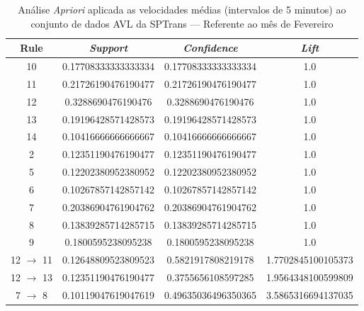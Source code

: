 \documentclass[
	12pt,				%
	oneside,			%
	a4paper,			%
	english,			%
	brazil				%
	]{abntex2ppgsi}
\begin{document}
\begin{apendicesenv}
\begin{table}[!htb]
\centering
\caption {Análise \textit{Apriori} aplicada as velocidades médias (intervalos de 5 minutos) ao conjunto de dados AVL da SPTrans --- Referente ao mês de Fevereiro}
\label {tab:aprioriFebruary}
\begin{tabular}{c|c|c|c}
\hline
\textbf{Rule} & \textit{\textbf{Support}} & \textit{\textbf{Confidence}} & \textit{\textbf{Lift}} \\
\hline
10 &  0.17708333333333334 &  0.17708333333333334 &  1.0\\ \hline 11 &  0.21726190476190477 &  0.21726190476190477 &  1.0\\ \hline 12 &  0.3288690476190476 &  0.3288690476190476 &  1.0\\ \hline 13 &  0.19196428571428573 &  0.19196428571428573 &  1.0\\ \hline 14 &  0.10416666666666667 &  0.10416666666666667 &  1.0\\ \hline 2 &  0.12351190476190477 &  0.12351190476190477 &  1.0\\ \hline 5 &  0.12202380952380952 &  0.12202380952380952 &  1.0\\ \hline 6 &  0.10267857142857142 &  0.10267857142857142 &  1.0\\ \hline 7 &  0.20386904761904762 &  0.20386904761904762 &  1.0\\ \hline 8 &  0.13839285714285715 &  0.13839285714285715 &  1.0\\ \hline 9 &  0.1800595238095238 &  0.1800595238095238 &  1.0\\ \hline 12 $\rightarrow$ 11 &  0.12648809523809523 &  0.5821917808219178 &  1.7702845100105373\\ \hline 12 $\rightarrow$ 13 &  0.12351190476190477 &  0.3755656108597285 &  1.9564348100599809\\ \hline 7 $\rightarrow$ 8 &  0.10119047619047619 &  0.49635036496350365 &  3.5865316694137035\\
\hline
\end{tabular}
\end{table}


\end{apendicesenv}
\end{document}
